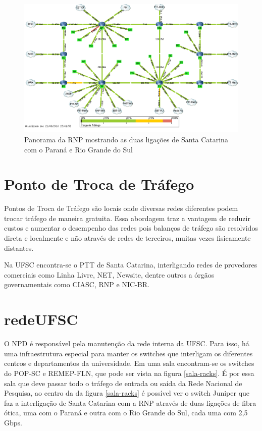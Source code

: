 \documentclass[brazil,times]{abnt}
\begin{document}
\begin{figure}[htp]
\begin{center}
  \includegraphics[scale=0.48]{imagens/panoramaRNP.png}
  \caption[Panorama da RNP mostrando as duas ligações de Santa
  Catarina com o Paraná e Rio Grande do Sul]{Panorama da RNP mostrando as duas ligações de Santa
  Catarina com o Paraná e Rio Grande do Sul}
  \label{panorama-rnp}
\end{center}
\end{figure}

\section*{Ponto de Troca de Tráfego}
Pontos de Troca de Tráfego são locais onde diversas redes diferentes podem
trocar tráfego de maneira gratuita. Essa abordagem traz a vantagem de reduzir
custos e aumentar o desempenho das redes pois balanços de tráfego são resolvidos
direta e localmente e não através de redes de terceiros, muitas vezes
fisicamente distantes. \cite{ptt-metro}

Na UFSC encontra-se o PTT de Santa Catarina, interligando redes de provedores
comerciais como Linha Livre, NET, Newsite, dentre outros a órgãos governamentais
como CIASC, RNP e NIC-BR.\cite{ptt-participantes}
 
\section*{redeUFSC}
O NPD é responsável pela manutenção da rede interna da UFSC.
Para isso, há uma infraestrutura especial para manter os switches que interligam
os diferentes centros e departamentos da universidade. Em uma sala encontram-se
os switches do POP-SC e REMEP-FLN, que pode ser vista na figura
\ref{sala-racks}. É por essa sala que deve passar todo o tráfego de entrada ou
saída da Rede Nacional de Pesquisa, ao centro da da figura \ref{sala-racks} é possível
ver o switch Juniper que faz a interligação de Santa Catarina com a RNP através
de duas ligações de fibra ótica, uma com o Paraná e outra com o Rio Grande do
Sul, cada uma com 2,5 Gbps.
\end{document}
